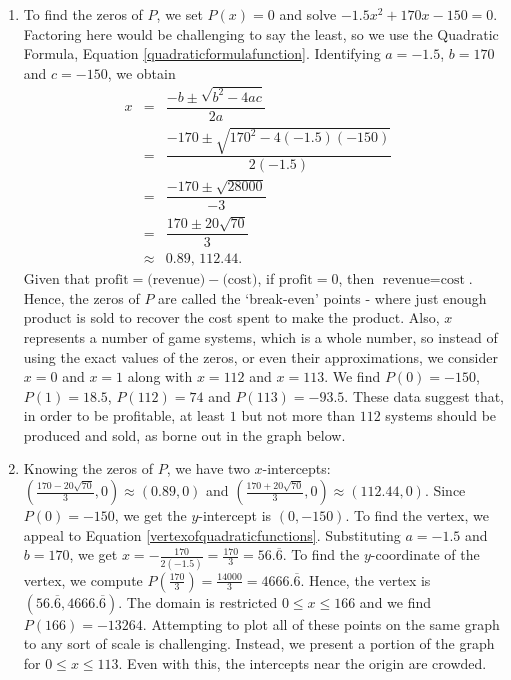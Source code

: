 \documentclass{ximera}
\begin{document}
\begin{ex}
\begin{enumerate}
\item  To find the zeros of $P$, we set $P(x) = 0$ and solve  $-1.5x^2+170x-150=0$. Factoring here would be challenging to say the least, so we use the Quadratic Formula,  Equation \ref{quadraticformulafunction}.  Identifying $a = -1.5$, $b=170$ and $c=-150$, we obtain\[ \begin{array}{rclr}

 x & = & \dfrac{-b \pm \sqrt{b^2-4ac}}{2a} & \\ [10pt]
   & = & \dfrac{-170 \pm \sqrt{170^2 - 4(-1.5)(-150)}}{2(-1.5)} & \\ [10pt]
	 & = & \dfrac{-170 \pm \sqrt{28000}}{-3} & \\ [10pt]
	 & = & \dfrac{170 \pm 20 \sqrt{70}}{3} & \\ [10pt]
	 & \approx & 0.89, \, 112.44. \end{array}\] Given that $\text{profit} = \text{(revenue)} - \text{(cost)}$, if $\text{profit} = 0$, then $\text{revenue} = \text{cost}$.  Hence, the zeros of $P$ are called the `break-even' points - where just enough product is sold to recover the cost spent to make the product. Also, $x$ represents a number of game systems, which is a whole number, so instead of using the exact values of the zeros, or even their approximations, we consider $x = 0$ and $x = 1$ along with $x = 112$ and $x=113$. We find $P(0) = -150$, $P(1) = 18.5$, $P(112) = 74$ and $P(113)= -93.5$.  These data suggest that, in order to be profitable, at least $1$ but not more than $112$ systems should be produced and sold, as borne out in the graph below.

\item Knowing the zeros of $P$, we have two $x$-intercepts: $\left( \frac{170 - 20 \sqrt{70}}{3},0\right) \approx (0.89,0)$ and $\left( \frac{170 + 20 \sqrt{70}}{3},0\right) \approx (112.44,0)$.  Since $P(0)=-150$, we get the  $y$-intercept is $(0,-150)$.  To find the vertex, we appeal to Equation \ref{vertexofquadraticfunctions}.  Substituting $a = -1.5$ and $b=170$, we get $x = -\frac{170}{2(-1.5)} = \frac{170}{3} = 56.\overline{6}$.  To find the $y$-coordinate of the vertex, we compute $P\left( \frac{170}{3} \right) = \frac{14000}{3} = 4666.\overline{6}$.  Hence, the vertex is $(56.\overline{6}, 4666.\overline{6})$.  The domain is restricted $0 \leq x \leq 166$ and we find $P(166) = -13264$.  Attempting to plot all of these points on the same graph to any sort of scale is challenging.  Instead, we present a portion of the graph for  $0 \leq x \leq 113$.  Even with this, the intercepts near the origin are crowded.


\end{enumerate}
\end{ex}
\end{document}
